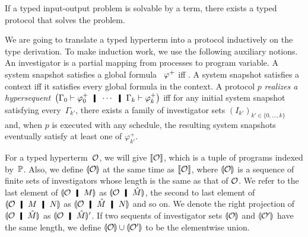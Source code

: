 {\begin{theorem}[Soundness]
If a typed input-output problem is solvable by a term,
there exists a typed protocol that solves the problem.
\end{theorem}

We are going to translate a typed hyperterm into a protocol inductively
on the type derivation.
To make induction work, we use the following auxiliary notions.
An investigator is a partial mapping from processes
to program variable.
A system snapshot satisfies a global formula%
~${\varphi}^+$
iff .
A system snapshot satisfies a context%
 iff it
satisfies every global formula in the context.
A protocol $p$ \textit{realizes a hypersequent}~$
\left(\Gamma_0\vdash
\m\varphi_0 \hmid \cdots\hmid\Gamma_{k}\vdash \m\varphi_{k}\right)$
iff
for any initial system snapshot satisfying
every~$\Gamma_{k'}$,
there exists a family of investigator sets
$(I_{k'})_{k'\in\{0,\ldots,k\}}$ and,
when $p$ is executed with any schedule,
the resulting system snapshots eventually satisfy at least one of
$\varphi_{k'}^+$.

For a typed
hyperterm~$\mathcal{O}$,
we will give $\llbracket{\mathcal{O}}\rrbracket$, which is a tuple of programs indexed
by~$\mathbb{P}$.
Also, we define $\llparenthesis{\mathcal{O}}\rrparenthesis$ at the same time as
$\llbracket{\mathcal{O}}\rrbracket$, where
$\llparenthesis{\mathcal{O}}\rrparenthesis$ is a sequence of finite sets of investigators whose
length is the same as that of $\mathcal{O}$.
We refer to the last element of $\semoi{\hypert\hmid M}$ as
$\semoi{\hypert\hmid \hat{M}}$, the second to last element of
$\semoi{\hypert\hmid M\hmid N}$ as
$\semoi{\hypert\hmid \hat M\hmid N}$ and so on.
We denote the right projection of $\semoi{\hypert\hmid \hat{M}}$ as
$\semoi{\hypert\hmid \hat{M}}'$.
If two sequents of investigator sets $\llparenthesis{\mathcal{O}}\rrparenthesis$ and $\llparenthesis{\mathcal{O}'}\rrparenthesis$
have the same length, we define $\llparenthesis{\mathcal{O}}\rrparenthesis\cup \llparenthesis{\mathcal{O}'}\rrparenthesis$ to
be the elementwise union.

}
